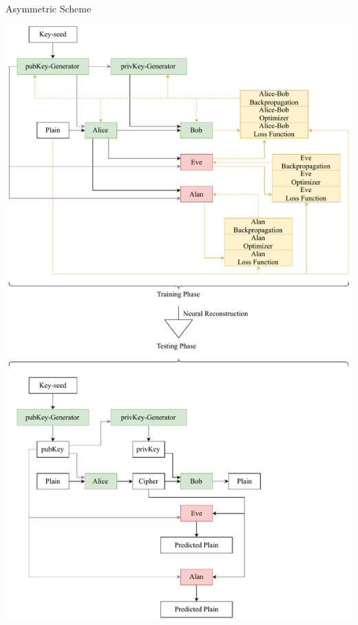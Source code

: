 \documentclass[a4paper, 12pt]{report}
\begin{document}
\begin{blockfigure}{ Asymmetric Scheme}
	\begin{center}
		\includegraphics[width = \textwidth, height = 0.98\textheight]{asymmetricScheme}
	\end{center}
\end{blockfigure}
\newpage
\end{document}
